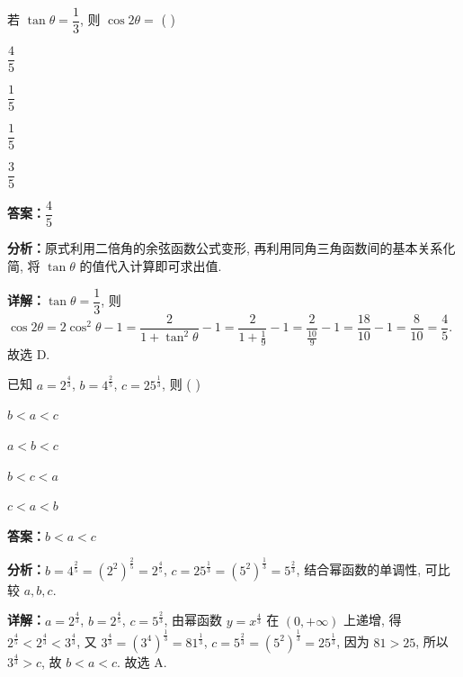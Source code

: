 \begin{question}[points=5]
若 $\tan\theta=\dfrac{1}{3}$, 则 $\cos2\theta=$ ( )
\begin{choices}
  \item $\dfrac{4}{5}$
  \item $\dfrac{1}{5}$
  \item $\dfrac{1}{5}$
  \item $\dfrac{3}{5}$
\end{choices}
\begin{solution}
\textbf{答案：}$\dfrac{4}{5}$

\textbf{分析：}原式利用二倍角的余弦函数公式变形, 再利用同角三角函数间的基本关系化简, 将 $\tan\theta$ 的值代入计算即可求出值.

\textbf{详解：}$\tan\theta=\dfrac{1}{3}$, 则 $\cos2\theta=2\cos^2\theta-1=\dfrac{2}{1+\tan^2\theta}-1=\dfrac{2}{1+\frac{1}{9}}-1=\dfrac{2}{\frac{10}{9}}-1=\dfrac{18}{10}-1=\dfrac{8}{10}=\dfrac{4}{5}$. 故选 D.
\end{solution}
\end{question}

\begin{question}[points=5]
已知 $a=2^{\frac{4}{3}}$, $b=4^{\frac{2}{5}}$, $c=25^{\frac{1}{3}}$, 则 ( )
\begin{choices}
  \item $b<a<c$
  \item $a<b<c$
  \item $b<c<a$
  \item $c<a<b$
\end{choices}
\begin{solution}
\textbf{答案：}$b<a<c$

\textbf{分析：}$b=4^{\frac{2}{5}}=(2^2)^{\frac{2}{5}}=2^{\frac{4}{5}}$, $c=25^{\frac{1}{3}}=(5^2)^{\frac{1}{3}}=5^{\frac{2}{3}}$, 结合幂函数的单调性, 可比较 $a,b,c$.

\textbf{详解：}$a=2^{\frac{4}{3}}$, $b=2^{\frac{4}{5}}$, $c=5^{\frac{2}{3}}$, 由幂函数 $y=x^{\frac{4}{3}}$ 在 $(0,+\infty)$ 上递增, 得 $2^{\frac{4}{5}}<2^{\frac{4}{3}}<3^{\frac{4}{3}}$, 又 $3^{\frac{4}{3}}=(3^4)^{\frac{1}{3}}=81^{\frac{1}{3}}$, $c=5^{\frac{2}{3}}=(5^2)^{\frac{1}{3}}=25^{\frac{1}{3}}$, 因为 $81>25$, 所以 $3^{\frac{4}{3}}>c$, 故 $b<a<c$. 故选 A.
\end{solution}
\end{question}

